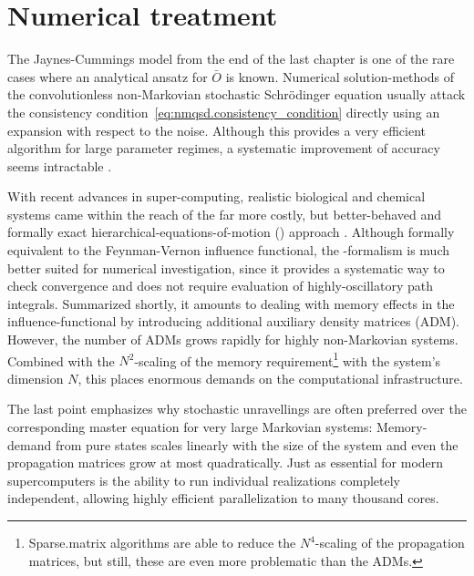 \chapter{Numerical treatment}
\label{chap:num}
%

The Jaynes-Cummings model from the end of the last chapter is one of the rare cases where an analytical ansatz for $\bar O$ is known.
Numerical solution-methods of the convolutionless non-Markovian stochastic Schrödinger equation usually attack the consistency condition~\ref{eq:nmqsd.consistency_condition} directly using an expansion with respect to the noise.
Although this provides a very efficient algorithm for large parameter regimes, a systematic improvement of accuracy seems intractable \cite{}.

With recent advances in super-computing, realistic biological and chemical systems came within the reach of the far more costly, but better-behaved and formally exact hierarchical-equations-of-motion (\HEOM) approach \cite{}.
Although formally equivalent to the Feynman-Vernon influence functional, the \HEOM-formalism is much better suited for numerical investigation, since it provides a systematic way to check convergence and does not require evaluation of highly-oscillatory path integrals.
Summarized shortly, it amounts to dealing with memory effects in the influence-functional by introducing additional auxiliary density matrices (ADM).
However, the number of ADMs grows rapidly for highly non-Markovian systems.
Combined with the $N^2$-scaling of the memory requirement\footnote{%
  Sparse.matrix algorithms are able to reduce the $N^4$-scaling of the propagation matrices, but still, these are even more problematic than the ADMs.
}
with the system's dimension $N$, this places enormous demands on the computational infrastructure.

The last point emphasizes why stochastic unravellings are often preferred over the corresponding master equation for very large Markovian systems:
Memory-demand from pure states scales linearly with the size of the system and even the propagation matrices grow at most quadratically.
Just as essential for modern supercomputers is the ability to run individual realizations completely independent, allowing highly efficient parallelization to many thousand cores.\\



